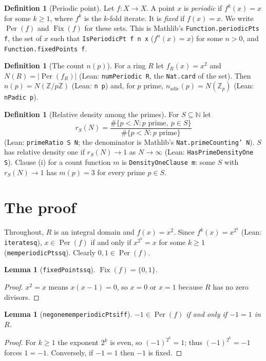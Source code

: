 \documentclass[11pt]{article}
\newtheorem{lemma}[theorem]{Lemma}
\theoremstyle{definition}
\newtheorem{definition}[theorem]{Definition}
\theoremstyle{remark}
\renewcommand{\_}{\oldus\allowbreak}
\newcommand{\Per}{\operatorname{Per}}
\newcommand{\Fix}{\operatorname{Fix}}
\begin{document}
\begin{definition}[Periodic point]
Let $f : X \to X$. A point $x$ is \emph{periodic} if $f^{k}(x) = x$ for some $k \ge 1$, where $f^k$ is the
$k$-fold iterate. It is \emph{fixed} if $f(x) = x$. We write $\Per(f)$ and $\Fix(f)$ for these sets. This is
Mathlib's \texttt{Function.periodicPts f}, the set of $x$ such that \texttt{IsPeriodicPt f n x}
($f^{n}(x) = x$) for some $n > 0$, and \texttt{Function.fixedPoints f}.
\end{definition}

\begin{definition}[The count $n(p)$]
For a ring $R$ let $f_R(x) = x^2$ and $N(R) = |\Per(f_R)|$ (Lean: \texttt{numPeriodic R}, the
\texttt{Nat.card} of the set). Then $n(p) = N(\mathbb{Z}/p\mathbb{Z})$ (Lean: \texttt{n p}) and, for $p$
prime, $n_{\mathrm{adic}}(p) = N(\mathbb{Z}_p)$ (Lean: \texttt{nPadic p}).
\end{definition}

\begin{definition}[Relative density among the primes]
For $S \subseteq \mathbb{N}$ let
\[
  r_S(N) = \frac{\#\{p < N : p \text{ prime}, \ p \in S\}}{\#\{p < N : p \text{ prime}\}}
\]
(Lean: \texttt{primeRatio S N}; the denominator is Mathlib's \texttt{Nat.primeCounting' N}). $S$ has
relative density one if $r_S(N) \to 1$ as $N \to \infty$ (Lean: \texttt{HasPrimeDensityOne S}). Clause (i)
for a count function $m$ is \texttt{DensityOneClause m}: some $S$ with $r_S(N)\to 1$ has $m(p) = 3$ for
every prime $p\in S$.
\end{definition}

\section{The proof}

Throughout, $R$ is an integral domain and $f(x) = x^2$. Since $f^{k}(x) = x^{2^k}$ (Lean:
\texttt{iterate\_sq}), $x \in \Per(f)$ if and only if $x^{2^k} = x$ for some $k \ge 1$
(\texttt{mem\_periodicPts\_sq}). Clearly $0, 1 \in \Per(f)$.

\begin{lemma}[\texttt{fixedPoints\_sq}]\label{lem:fix}
$\Fix(f) = \{0, 1\}$.
\end{lemma}
\begin{proof}
$x^2 = x$ means $x(x-1) = 0$, so $x = 0$ or $x = 1$ because $R$ has no zero divisors.
\end{proof}

\begin{lemma}[\texttt{neg\_one\_mem\_periodicPts\_iff}]\label{lem:neg}
$-1 \in \Per(f)$ if and only if $-1 = 1$ in $R$.
\end{lemma}
\begin{proof}
For $k \ge 1$ the exponent $2^k$ is even, so $(-1)^{2^k} = 1$; thus $(-1)^{2^k} = -1$ forces $1 = -1$.
Conversely, if $-1 = 1$ then $-1$ is fixed.
\end{proof}
\end{document}
